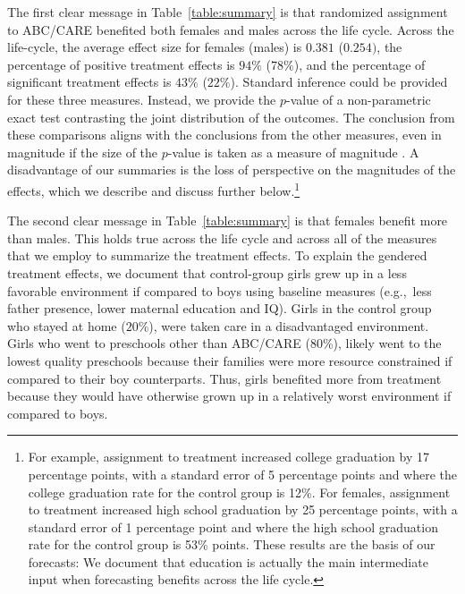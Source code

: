 The first clear message in Table~\ref{table:summary} is that randomized assignment to ABC/CARE benefited both females and males across the life cycle. Across the life-cycle, the average effect size for females (males) is $0.381$ ($0.254)$, the percentage of positive treatment effects is $94\%$ ($78\%$), and the percentage of significant treatment effects is $43\%$ ($22\%$). Standard inference could be provided for these three measures. Instead, we provide the $p$-value of a non-parametric exact test contrasting the joint distribution of the outcomes. The conclusion from these comparisons aligns with the conclusions from the other measures, even in magnitude if the size of the $p$-value is taken as a measure of magnitude \citep{Fisher_1935_Inference_JRSS}. A disadvantage of our summaries is the loss of perspective on the magnitudes of the effects, which we describe and discuss further below.\footnote{For example, assignment to treatment increased college graduation by 17 percentage points, with a standard error of 5 percentage points and where the college graduation rate for the control group is 12\%. For females, assignment to treatment increased high school graduation by 25 percentage points, with a standard error of 1 percentage point and where the high school graduation rate for the control group is 53\% points. These results are the basis of our forecasts: We document that education is actually the main intermediate input when forecasting benefits across the life cycle.}

The second clear message in Table~\ref{table:summary} is that females benefit more than males. This holds true across the life cycle and across all of the measures that we employ to summarize the treatment effects. To explain the gendered treatment effects, we document that control-group girls grew up in a less favorable environment if compared to boys using baseline measures (e.g.,\ less father presence, lower maternal education and IQ). Girls in the control group who stayed at home ($20\%$), were taken care in a disadvantaged environment. Girls who went to preschools other than ABC/CARE (80\%), likely went to the lowest quality preschools because their families were more resource constrained if compared to their boy counterparts. Thus, girls benefited more from treatment because they would have otherwise grown up in a relatively worst environment if compared to boys.

